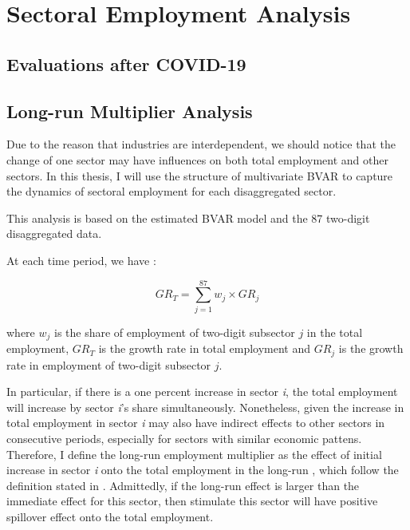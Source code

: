 \documentclass{monashthesis}
\begin{document}
\newpage

\hypertarget{sectoral-employment-analysis}{%
\chapter{Sectoral Employment Analysis}\label{sectoral-employment-analysis}}

\hypertarget{evaluations-after-covid-19}{%
\section{Evaluations after COVID-19}\label{evaluations-after-covid-19}}

\hypertarget{long-run-multiplier-analysis}{%
\section{Long-run Multiplier Analysis}\label{long-run-multiplier-analysis}}

Due to the reason that industries are interdependent, we should notice that the change of one sector may have influences on both total employment and other sectors. In this thesis, I will use the structure of multivariate BVAR to capture the dynamics of sectoral employment for each disaggregated sector.

This analysis is based on the estimated BVAR model and the 87 two-digit disaggregated data.

At each time period, we have :

\[
GR_T=\sum_{j=1}^{87} w_j\times {GR}_j
\]

where \(w_j\) is the share of employment of two-digit subsector \(j\) in the total employment, \(GR_T\) is the growth rate in total employment and \(GR_j\) is the growth rate in employment of two-digit subsector \(j\).

In particular, if there is a one percent increase in sector \emph{i}, the total employment will increase by sector \emph{i}'s share simultaneously. Nonetheless, given the increase in total employment in sector \emph{i} may also have indirect effects to other sectors in consecutive periods, especially for sectors with similar economic pattens. Therefore, I define the long-run employment multiplier as the effect of initial increase in sector \emph{i} onto the total employment in the long-run , which follow the definition stated in \textcite{anderson2020}. Admittedly, if the long-run effect is larger than the immediate effect for this sector, then stimulate this sector will have positive spillover effect onto the total employment.
\end{document}

